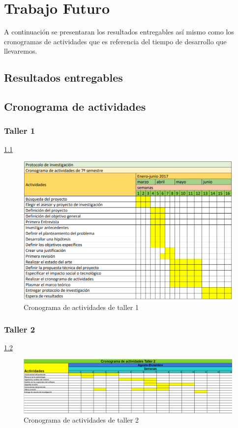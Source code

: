  \chapter{Trabajo Futuro}

A continuación se presentaran los resultados entregables así mismo como los cronogramas de actividades que es referencia del tiempo de desarrollo que llevaremos.

 \section{Resultados entregables}
 


\section{Cronograma de actividades}
    \subsection{Taller 1}\ref{Taller1}
    \begin{figure}[h]

      \centering
      \includegraphics[scale=.7]{lib/assets/cronograma-1}
      \caption{Cronograma de actividades de taller 1}
      \label{Taller1}
    \end{figure}

    \subsection{Taller 2}\ref{Taller2}

    \begin{figure}[h]
      \centering
      \includegraphics[scale=.5]{lib/assets/cronogramataller2}
      \caption{Cronograma de actividades de taller 2}
      \label{Taller2}
    \end{figure}


